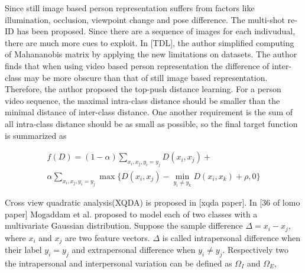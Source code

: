 \documentclass[conference,compsoc]{IEEEtran}
\begin{document}
Since still image based person representation suffers from factors like illumination, occlusion, viewpoint change and pose difference. The multi-shot re-ID has been proposed. Since there are a sequence of images for each indivudual, there are much more cues to exploit.
In [TDL], the author simplified computing of Mahananobis matrix by applying the new limitations on datasets. The author finds that when using video based person representation the difference of inter-class may be more obscure than that of still image based representation. Therefore, the author proposed the top-push distance learning. For a person video sequence, the maximal intra-class distance should be smaller than the minimal distance of inter-class distance. One another requirement is the sum of all intra-class distance should be as small as possible, so the final target function is summarized as 

\begin{equation}
\begin{aligned}
f(D) = (1-\alpha)\sum_{x_i,x_j,y_i=y_j} D(x_i,x_j) + \\ \alpha \sum_{x_i,x_j,y_i=y_j}\max\{{D(x_i,x_j)-\min_{y_i\ne y_k}{D(x_i,x_k)}+\rho,0}\}
\end{aligned}
\end{equation}

Cross view quadratic analysis(XQDA) is proposed in [xqda paper]. In [36 of lomo paper] Mogaddam et al. proposed to model each of two classes with a multivariate Gaussian  distribution. Suppose the sample difference $\Delta = x_i - x_j$, where $x_i$ and $x_j$ are two feature vectors. $\Delta$ is called intrapersonal difference when their label $y_i = y_j$ and extrapersonal difference when $y_i \ne y_j$. Respectively two the intrapersonal and interpersonal variation can be defined as $\Omega_I$ and $\Omega_E$,
\end{document}
